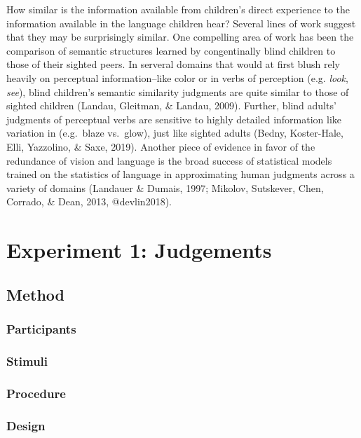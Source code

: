 \documentclass[10pt, letterpaper]{article}
\begin{document}
How similar is the information available from children's direct
experience to the information available in the language children hear?
Several lines of work suggest that they may be surprisingly similar. One
compelling area of work has been the comparison of semantic structures
learned by congentinally blind children to those of their sighted peers.
In serveral domains that would at first blush rely heavily on perceptual
information--like color or in verbs of perception (e.g. \emph{look},
\emph{see}), blind children's semantic similarity judgments are quite
similar to those of sighted children (Landau, Gleitman, \& Landau,
2009). Further, blind adults' judgments of perceptual verbs are
sensitive to highly detailed information like variation in (e.g.~blaze
vs.~glow), just like sighted adults (Bedny, Koster-Hale, Elli,
Yazzolino, \& Saxe, 2019). Another piece of evidence in favor of the
redundance of vision and language is the broad success of statistical
models trained on the statistics of language in approximating human
judgments across a variety of domains (Landauer \& Dumais, 1997;
Mikolov, Sutskever, Chen, Corrado, \& Dean, 2013, @devlin2018).

\hypertarget{experiment-1-judgements}{%
\section{Experiment 1: Judgements}\label{experiment-1-judgements}}

\hypertarget{method}{%
\subsection{Method}\label{method}}

\hypertarget{participants}{%
\subsubsection{Participants}\label{participants}}

\hypertarget{stimuli}{%
\subsubsection{Stimuli}\label{stimuli}}

\hypertarget{procedure}{%
\subsubsection{Procedure}\label{procedure}}

\hypertarget{design}{%
\subsubsection{Design}\label{design}}
\end{document}
